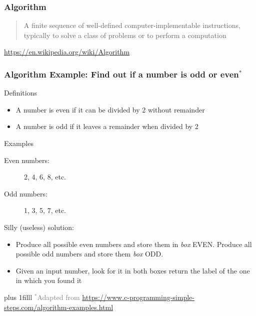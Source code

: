 \documentclass[xcolor=x11names,handout]{beamer}
\newcommand{\light}[1]{\textcolor{gray}{#1}}
\newcommand{\btVFill}{\vskip0pt plus 1filll}
\begin{document}
\begin{frame}
\frametitle{Algorithm}

\begin{quote}
A finite sequence of \alert{well-defined computer-implementable} instructions, 
typically to solve a class of problems or to perform a computation
\end{quote}
\begin{flushright}
\footnotesize
 \light{\url{https://en.wikipedia.org/wiki/Algorithm}}
\end{flushright}
\end{frame}

\begin{frame}
\frametitle{Algorithm Example: Find out if a number is odd or 
even$^*$}
\pause 

\alert{Definitions}

\begin{itemize}
 \item A number is \alert{even} if it can be divided by 2 without remainder
 \item A number is \alert{odd} if it leaves a remainder when divided by 2
\end{itemize}				\pause 

\alert{Examples}

\begin{description}
 \item[Even numbers:] 2, 4, 6, 8, etc. 
 \item[Odd numbers:] 1, 3, 5, 7, etc.
\end{description}			\pause 

\alert{Silly (useless) solution:}

\begin{itemize}
 \item Produce all possible even numbers and store them in \textit{box}  
EVEN\@. Produce all possible odd numbers and store them \textit{box} ODD\@. 
 \item Given an input number, look for it in both boxes return the label of 
the one in which you found it
\end{itemize}	

\btVFill
\onslide
\footnotesize
\light{$^*$Adapted from 
\url{https://www.c-programming-simple-steps.com/algorithm-examples.html}}
\end{frame}
\end{document}
